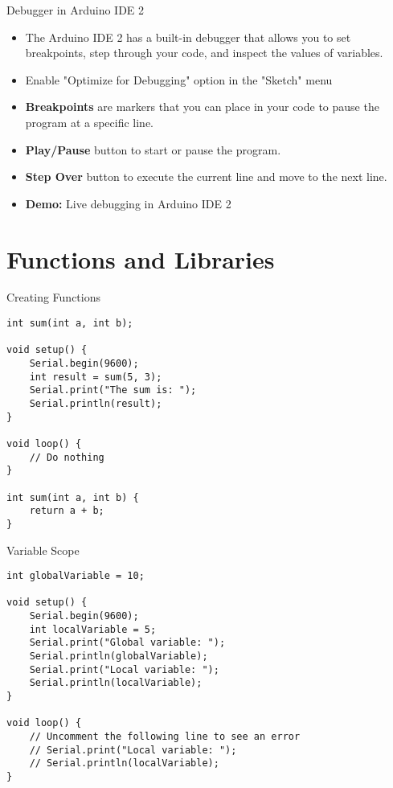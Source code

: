 \documentclass[sectionframe]{oxblue-beamer}
\begin{document}
\begin{frame}{Debugger in Arduino IDE 2}
\begin{itemize}
    \item The Arduino IDE 2 has a built-in debugger that allows you to set breakpoints, step through your code, and inspect the values of variables.
    \item Enable "Optimize for Debugging" option in the "Sketch" menu
    \item \textbf{Breakpoints} are markers that you can place in your code to pause the program at a specific line.
    \item \textbf{Play/Pause} button to start or pause the program.
    \item \textbf{Step Over} button to execute the current line and move to the next line.
    \item \textbf{Demo:} Live debugging in Arduino IDE 2
\end{itemize}
\end{frame}

\section{Functions and Libraries}

\begin{frame}[fragile]{Creating Functions}
\begin{verbatim}
int sum(int a, int b);

void setup() {
    Serial.begin(9600);
    int result = sum(5, 3);
    Serial.print("The sum is: ");
    Serial.println(result);
}

void loop() {
    // Do nothing
}

int sum(int a, int b) {
    return a + b;
}
\end{verbatim}
\end{frame}

\begin{frame}[fragile]{Variable Scope}
\begin{verbatim}
int globalVariable = 10;

void setup() {
    Serial.begin(9600);
    int localVariable = 5;
    Serial.print("Global variable: ");
    Serial.println(globalVariable);
    Serial.print("Local variable: ");
    Serial.println(localVariable);
}

void loop() {
    // Uncomment the following line to see an error
    // Serial.print("Local variable: ");
    // Serial.println(localVariable);
}
\end{verbatim}
\end{frame}
\end{document}
